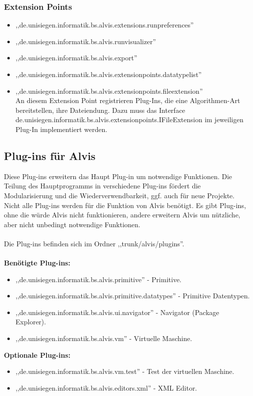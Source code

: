 \documentclass[10pt,a4paper,oneside]{scrbook}
\begin{document}
\subsubsection{Extension Points}
\begin{itemize}
 \item ,,de.unisiegen.informatik.bs.alvis.extensions.runpreferences''\\
 \item ,,de.unisiegen.informatik.bs.alvis.runvisualizer''\\
 \item ,,de.unisiegen.informatik.bs.alvis.export''\\
 \item ,,de.unisiegen.informatik.bs.alvis.extensionpoints.datatypelist''\\
 \item ,,de.unisiegen.informatik.bs.alvis.extensionpoints.fileextension''\\ An diesem Extension Point registrieren Plug-Ins,
	  die eine Algorithmen-Art bereitstellen, ihre Dateiendung. Dazu muss das Interface\\
	  de.unisiegen.informatik.bs.alvis.extensionpoints.IFileExtension im jeweiligen Plug-In implementiert werden.
\end{itemize}

\subsection{Plug-ins für Alvis}
Diese Plug-ins erweitern das Haupt Plug-in um notwendige Funktionen. Die Teilung des Hauptprogramms in verschiedene Plug-ins fördert die Modularisierung und die Wiederverwendbarkeit, ggf. auch für neue Projekte.
\\
Nicht alle Plug-ins werden für die Funktion von Alvis benötigt. Es gibt Plug-ins, ohne die würde Alvis nicht funktionieren, andere erweitern Alvis um nützliche, aber nicht unbedingt notwendige Funktionen.
\\ \\
Die Plug-ins befinden sich im Ordner ,,trunk/alvis/plugins''.
\\ \\
\textbf{Benötigte Plug-ins:}
\begin{itemize}
\item ,,de.unisiegen.informatik.bs.alvis.primitive'' - Primitive.
\item ,,de.unisiegen.informatik.bs.alvis.primitive.datatypes'' - Primitive Datentypen.
\item ,,de.unisiegen.informatik.bs.alvis.ui.navigator'' - Navigator (Package Explorer).
\item ,,de.unisiegen.informatik.bs.alvis.vm'' - Virtuelle Maschine.
\end{itemize}
\textbf{Optionale Plug-ins:}
\begin{itemize}
\item ,,de.unisiegen.informatik.bs.alvis.vm.test'' - Test der virtuellen Maschine.
\item ,,de.unisiegen.informatik.bs.alvis.editors.xml'' - XML Editor.
\end{itemize}
\end{document}
